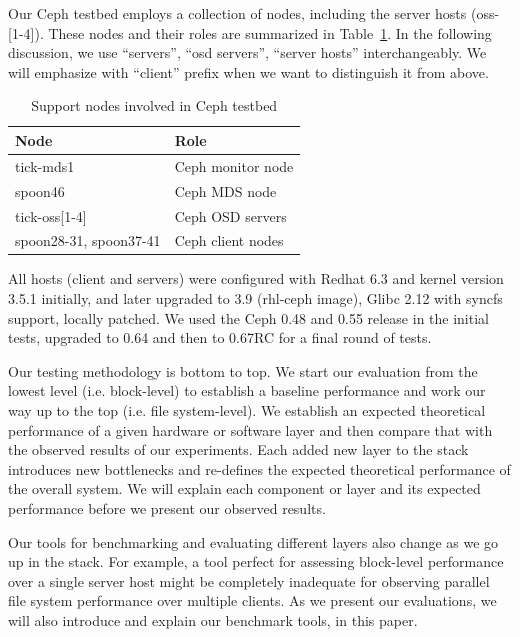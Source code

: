 Our Ceph testbed employs a collection of nodes, including the server hosts
(oss-[1-4]). These nodes and their roles are summarized in
Table~\ref{tbl:ceph-test-nodes}. In the following discussion, we use
``servers'', ``osd servers'', ``server hosts'' interchangeably. We will
emphasize with ``client'' prefix when we want to distinguish it from above.

\begin{table}[!t]
\centering
\caption{Support nodes involved in Ceph testbed}
\label{tbl:ceph-test-nodes}
    \begin{tabular}{ll}
    \hline
    Node & Role \\
    \hline
    tick-mds1 & Ceph monitor node \\
    spoon46 & Ceph MDS node \\
    tick-oss[1-4] & Ceph OSD servers \\
    spoon28-31, spoon37-41 & Ceph client nodes \\
    \hline
    \end{tabular}
\end{table}

All hosts  (client and servers) were configured with Redhat 6.3 and kernel
version 3.5.1 initially, and later upgraded to 3.9 (rhl-ceph image), Glibc
2.12 with syncfs support, locally patched.  We used the Ceph 0.48 and 0.55
release in the initial tests, upgraded to 0.64 and then to 0.67RC for a final
round of tests.




Our testing methodology is bottom to top. We start our evaluation from the
lowest level (i.e. block-level)  to establish a baseline performance and work
our way up to the top (i.e. file system-level). We establish an expected
theoretical performance of a given hardware or software layer and then compare
that with the observed results of our experiments. Each added new layer to the
stack introduces new bottlenecks and re-defines the expected theoretical
performance of the overall system. We will explain each component or layer and
its expected performance before we present our observed results.

Our tools for benchmarking and evaluating different layers also change as we go
up in the stack.  For example, a tool perfect for assessing block-level
performance over a single server host might be completely inadequate for
observing parallel file system performance over multiple clients. As we present
our evaluations, we will also introduce and explain our benchmark tools, in
this paper.
